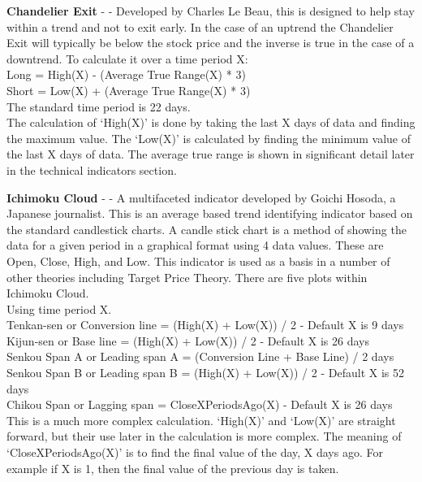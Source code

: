 \documentclass[conference]{IEEEtran}
\begin{document}

\noindent
\textbf{Chandelier Exit} - \cite{Elder2002} - Developed by Charles Le Beau, this is designed to help stay within a trend and not to exit early. In the case of an uptrend the Chandelier Exit will typically be below the stock price and the inverse is true in the case of a downtrend. To calculate it over a time period X:\\

\noindent
Long = High(X) - (Average True Range(X) * 3)\\
Short = Low(X) + (Average True Range(X) * 3)\\
\noindent
The standard time period is 22 days.\\

The calculation of `High(X)' is done by taking the last X days of data and finding the maximum value. The `Low(X)' is calculated by finding the minimum value of the last X days of data. The average true range is shown in significant detail later in the technical indicators section.

\noindent
\textbf{Ichimoku Cloud} - \cite{Murphy1999} - A multifaceted indicator developed by Goichi Hosoda, a Japanese journalist. This is an average based trend identifying indicator based on the standard candlestick charts. A candle stick chart is a method of showing the data for a given period in a graphical format using 4 data values. These are Open, Close, High, and Low. This indicator is used as a basis in a number of other theories including Target Price Theory. There are five plots within Ichimoku Cloud.\\

\noindent
Using time period X.\\
Tenkan-sen or Conversion line = (High(X) + Low(X)) / 2  - Default X is 9 days\\
Kijun-sen or Base line = (High(X) + Low(X)) / 2 - Default X is 26 days\\
Senkou Span A or Leading span A = (Conversion Line + Base Line) / 2 days \\
Senkou Span B or Leading span B = (High(X) + Low(X)) / 2 - Default X is 52 days\\
Chikou Span or Lagging span = CloseXPeriodsAgo(X) - Default X is 26 days\\

This is a much more complex calculation. `High(X)' and `Low(X)' are straight forward, but their use later in the calculation is more complex. The meaning of `CloseXPeriodsAgo(X)' is to find the final value of the day, X days ago. For example if X is 1, then the final value of the previous day is taken.\\
\end{document}
